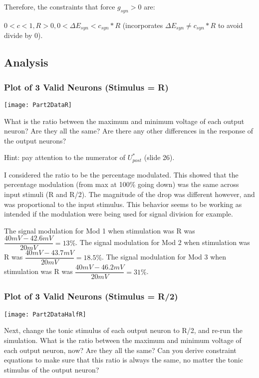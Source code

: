 Therefore, the constraints that force $g_{syn} >0$ are:

$0 < c < 1, R > 0, 0 < \Delta E_{syn} < c_{syn} * R$ (incorporates $\Delta E_{syn} \neq c_{syn} * R$ to avoid divide by 0).

\subsection{Analysis}

\subsubsection{Plot of 3 Valid Neurons (Stimulus = R)}

\texttt{[image: Part2DataR]}

What is the ratio between the maximum and minimum voltage of each output
neuron? Are they all the same? Are there any other differences in the response
of the output neurons?

Hint: pay attention to the numerator of $U^{*}_{post}$ (slide 26).

I considered the ratio to be the percentage modulated. This showed that the percentage modulation (from max at 100\% going down) was the same across input stimuli (R and R/2). The magnitude of the drop was different however, and was proportional to the input stimulus. This behavior seems to be working as intended if the modulation were being used for signal division for example.

The signal modulation for Mod 1 when stimulation was R was $\dfrac{40 mV - 42.6 mV}{20 mV} = 13\%$.
The signal modulation for Mod 2 when stimulation was R was $\dfrac{40 mV - 43.7 mV}{20 mV} = 18.5\%$.
The signal modulation for Mod 3 when stimulation was R was $\dfrac{40 mV - 46.2 mV}{20 mV} = 31\%$.

\subsubsection{Plot of 3 Valid Neurons (Stimulus = R/2)}

\texttt{[image: Part2DataHalfR]}

Next, change the tonic stimulus of each output neuron 
to R/2, and re-run the simulation. What is the ratio between the maximum and 
minimum voltage of each output neuron, now? Are they all the same? Can you 
derive constraint equations to make sure that this ratio is always the
same, no matter the tonic stimulus of the output neuron?


